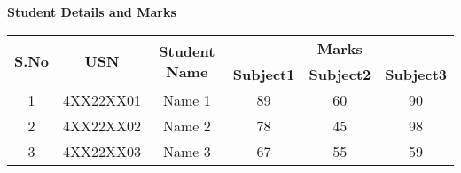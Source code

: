 \documentclass{article}
\begin{document}
\centering
\textbf{\Large{Student Details and Marks}}
\vspace{0.1in}

\begin{table}[h]
\centering
\begin{tabular}{|c|c|c|c|c|c|}
\hline
\multirow{2}{*}{\textbf{S.No}} & \multirow{2}{*}{\textbf{USN}} & 
\multirow{2}{*}{\textbf{Student Name}} & \multicolumn{3}{c|}{\textbf{Marks}} \\

\cline{4-6}
 &  &  & \textbf{Subject1} & \textbf{Subject2} & \textbf{Subject3} \\
\hline
1 & 4XX22XX01 & Name 1 & 89 & 60 & 90 \\
\hline
2 & 4XX22XX02 & Name 2 & 78 & 45 & 98 \\
\hline
3 & 4XX22XX03 & Name 3 & 67 & 55 & 59 \\
\hline

\end{tabular}
\end{table}
\end{document}
